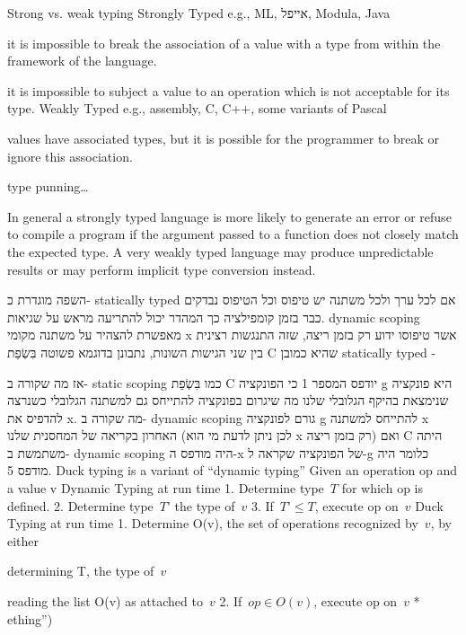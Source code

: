 \begin{טבלא}[!htbp]
        Strong vs. weak typing
        Strongly Typed e.g., ML, אייפל, Modula, Java
          \item it is impossible to break the association of a value
          with a type from within the framework of the language.
          \item it is impossible to subject a value to an operation
          which is not acceptable for its type.
          Weakly Typed e.g., assembly, C, C++, some variants of Pascal
          \item values have associated types, but it is possible for
          the programmer to break or ignore this association.
          \item type punning…

        In general a strongly typed language is more likely to generate an error or refuse to compile a program if the argument passed to a function does not closely match the expected type. A very weakly typed language may produce unpredictable results or may perform implicit type conversion instead.

        השפה מוגדרת כ- statically typed אם לכל ערך ולכל משתנה יש טיפוס וכל הטיפוס נבדקים כבר בזמן קומפילציה כך המהדר יכול להתריעה מראש על שגיאות.
        dynamic scoping מאפשרת להצהיר על משתנה מקומי x אשר טיפוסו ידוע רק בזמן ריצה, שזה התנגשות רצינית בין שני הגישות השונות, נתבונן בדוגמא פשוטה בִּשְׂפַת C שהיא כמובן statically typed -

        אז מה שקורה ב- static scoping כמו בִּשְׂפַת C יודפס המספר 1 כי הפונקציה g היא פונקציה שנימצאת בהיקף הגלובלי שלנו מה שיגרום בפונקציה להתייחס גם למשתנה הגלובלי כשנרצה להדפיס את x.
        מה שקורה ב- dynamic scoping גורם לפונקציה g להתייחס למשתנה x האחרון בקריאה של המחסנית שלנו (לכן ניתן לדעת מי הוא x רק בזמן ריצה) ואם C היתה משתמשת ב- dynamic scoping היה מודפס ה-x של הפונקציה שקראה ל-g כלומר היה מודפס 5.
        Duck typing is a variant of “dynamic typing”
        Given an operation op and a value v
        Dynamic Typing at run time
        1. Determine type~$T$ for which op is defined.
        2. Determine type~$T’$ the type of~$v$
        3. If~$T’≤T$, execute op on~$v$
        Duck Typing at run time
        1. Determine O(v), the set of operations recognized by~$v$, by either
          \item determining T, the type of~$v$
          \item reading the list O(v) as attached to~$v$
        2. If~$op∈O(v)$, execute op on~$v$
        * ething”)


\end{טבלא}
